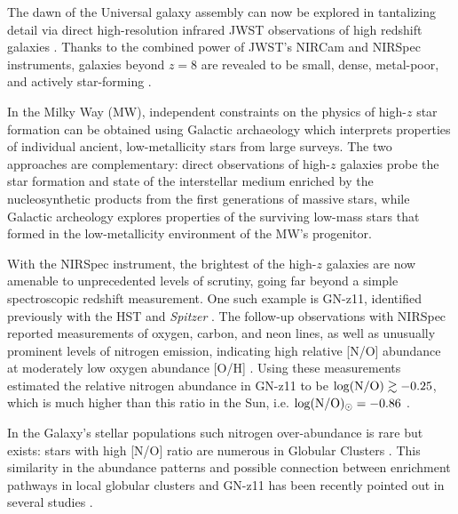 \documentclass[a4paper,useAMS,usenatbib]{mnras}
\begin{document}
The dawn of the Universal galaxy assembly can now be explored in tantalizing detail via direct high-resolution infrared JWST observations of high redshift galaxies \citep[see, e.g.,][]{Donnan2023, Harikane2023, Finkelstein2023,Robertson2023}. Thanks to the combined power of JWST's NIRCam and NIRSpec instruments, galaxies beyond $z=8$ are revealed to be small, dense, metal-poor, and actively star-forming \citep[see, e.g.,][]{Ono2022,Tacchella2023,Robertson2023,Bowens2023,Curtis-Lake2023}. 

In the Milky Way (MW), independent constraints on the physics of high-$z$ star formation can be obtained using Galactic archaeology which interprets properties of individual ancient, low-metallicity stars from large surveys. The two approaches are complementary: direct observations of high-$z$ galaxies probe the star formation and state of the interstellar medium enriched by the nucleosynthetic products from the first generations of massive stars, while Galactic archeology explores properties of the surviving low-mass stars that formed in the low-metallicity environment of the MW's progenitor.

With the NIRSpec instrument, the brightest of the high-$z$ galaxies are now amenable to unprecedented levels of scrutiny, going far beyond a simple spectroscopic redshift measurement. One such example is GN-z11, identified previously with the HST and {\it Spitzer} \citep[][]{Oesch2016}. The follow-up observations with NIRSpec reported measurements of oxygen, carbon, and neon lines, as well as unusually prominent levels of nitrogen emission, indicating high relative [N/O] abundance at moderately low oxygen abundance [O/H] \citep[][]{Bunker2023}. Using these measurements  \citet{Cameron2023} estimated the relative nitrogen abundance in GN-z11 to be $\log({\rm N}/{\rm O})\gtrsim -0.25$, which is much higher than this ratio in the Sun, i.e. $\log({\rm N}/{\rm O})_{\odot}= -0.86$ \citep[see][]{Lodders2019}. 

In the Galaxy's stellar populations such nitrogen over-abundance is rare but exists: stars with high [N/O] ratio are numerous in Globular Clusters \citep[see, e.g.,][]{Bastian_Lardo2018, Gratton2019, Miloni_Marino2022}. This similarity in the abundance patterns and possible connection between enrichment pathways in local globular clusters and GN-z11 has been recently pointed out in several studies \citep[][]{Cameron2023, Senchyna2023, Charbonnel2023}.
\end{document}

